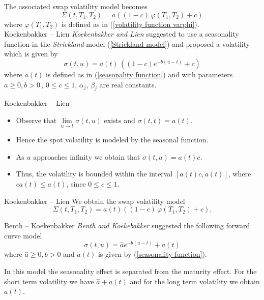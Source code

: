 The associated swap volatility model becomes
\begin{equation}
\Sigma(t,T_1,T_2)=a((1-c)\,\varphi(T_1,T_2)+c)
\end{equation}
where $\varphi(T_1,T_2)$ is defined as in (\ref{volatility function varphi}).\\




{Koekenbakker -- Lien}
\emph{Koekenbakker and Lien} suggested to use a seasonality function in the \emph{Strickland} model (\ref{Strickland model}) and proposed a volatility which is given by
\begin{equation}
\sigma(t,u)=a(t)\, ((1-c)e^{-b(u-t)}+c)
\end{equation}
where $a(t)$ is defined as in (\ref{seasonality function}) and with parameters $a \ge 0, b > 0\, ,\, 0 \le c \le 1, \,\alpha_j, \, \beta_j$ are real constants.



{Koekenbakker -- Lien}
\begin{itemize}
\item<1-> Observe that $\lim \limits_{u \to t} \sigma(t,u)$ exists and $\sigma(t,t)=a(t)$.
\item<2-> Hence the spot volatility is modeled by the seasonal function.
\item<3-> As $u$ approaches infinity we obtain that $\sigma(t,u)=a(t)c$.
\item<4-> Thus, the volatility is bounded within the interval $[a(t)c, a(t)]$, where $ca(t) \le a(t)$, since $0 \le c \le 1$.\\
\end{itemize}



{Koekenbakker -- Lien}
We obtain the swap volatility model
\begin{equation}
\Sigma(t,T_1,T_2)=a(t) ((1-c)\, \varphi(T_1,T_2)+c).
\end{equation}



{Benth -- Koekenbakker}
\emph{Benth and Koekebakker} suggested the following forward curve model
\begin{equation}
\sigma(t,u)=\hat{a} e^{-b(u-t)}+a(t)
\end{equation}
where $\hat{a} \ge 0, b>0$ and $a(t)$ is given by (\ref{seasonality function}).

In this model the seasonality effect is separated from the maturity effect. For the short term volatility we have $\hat{a}+a(t)$ and for the long term volatility we obtain $a(t)$.




